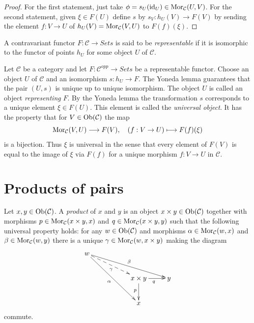 \begin{proof}
For the first statement, just take
$\phi = s_U(\text{id}_U) \in \mathop{\mathrm{Mor}}\nolimits_\mathcal{C}(U, V)$.
For the second statement, given $\xi \in F(U)$ define
$s$ by $s_V : h_U(V) \to F(V)$ by sending the element $f : V \to U$
of $h_U(V) = \mathop{\mathrm{Mor}}\nolimits_\mathcal{C}(V, U)$ to $F(f)(\xi)$.
\end{proof}

\begin{definition}
\label{definition-representable-functor}
A contravariant functor $F : \mathcal{C}\to \textit{Sets}$ is said
to be {\it representable} if it is isomorphic to the functor of
points $h_U$ for some object $U$ of $\mathcal{C}$.
\end{definition}

\noindent
Let $\mathcal{C}$ be a category and let
$F : \mathcal{C}^{opp} \to \textit{Sets}$ be a representable functor.
Choose an object $U$ of $\mathcal{C}$ and an isomorphism $s : h_U \to F$.
The Yoneda lemma guarantees that the pair $(U, s)$
is unique up to unique isomorphism. The object
$U$ is called an object {\it representing} $F$.
By the Yoneda lemma the transformation $s$ corresponds to a unique
element $\xi \in F(U)$. This element is called the {\it universal object}.
It has the property that for $V \in \mathop{\mathrm{Ob}}\nolimits(\mathcal{C})$ the map
$$
\mathop{\mathrm{Mor}}\nolimits_\mathcal{C}(V, U) \longrightarrow F(V),\quad
(f : V \to U) \longmapsto F(f)(\xi)
$$
is a bijection. Thus $\xi$ is universal in the sense that every element
of $F(V)$ is equal to the image of $\xi$ via $F(f)$ for a unique morphism
$f : V \to U$ in $\mathcal{C}$.






\section{Products of pairs}
\label{section-products-pairs}

\begin{definition}
\label{definition-products}
Let $x, y\in \mathop{\mathrm{Ob}}\nolimits(\mathcal{C})$.
A {\it product} of $x$ and $y$ is
an object $x \times y \in \mathop{\mathrm{Ob}}\nolimits(\mathcal{C})$
together with morphisms
$p\in \mathop{\mathrm{Mor}}\nolimits_{\mathcal C}(x \times y, x)$ and
$q\in\mathop{\mathrm{Mor}}\nolimits_{\mathcal C}(x \times y, y)$ such
that the following universal property holds: for
any $w\in \mathop{\mathrm{Ob}}\nolimits(\mathcal{C})$ and morphisms
$\alpha \in \mathop{\mathrm{Mor}}\nolimits_{\mathcal C}(w, x)$ and
$\beta \in \mathop{\mathrm{Mor}}\nolimits_\mathcal{C}(w, y)$
there is a unique
$\gamma\in \mathop{\mathrm{Mor}}\nolimits_{\mathcal C}(w, x \times y)$ making
the diagram
$$
\xymatrix{
w \ar[rrrd]^\beta \ar@{-->}[rrd]_\gamma \ar[rrdd]_\alpha & & \\
& & x \times y \ar[d]_p \ar[r]_q & y \\
& & x &
}
$$
commute.
\end{definition}

